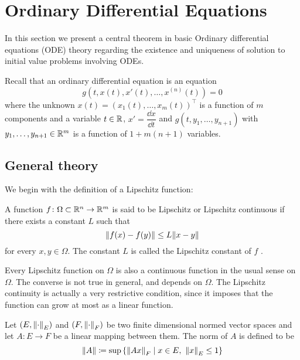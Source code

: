 
\section{Ordinary Differential Equations}

In this section we present a central theorem in basic Ordinary differential
equations (ODE) theory regarding the existence and uniqueness of solution to
initial value problems involving ODEs. 

Recall that an ordinary differential equation is an equation
\begin{equation}
	g(t, x(t), x'(t), \ldots, x^{(n)}(t)) = 0
\end{equation}
where the unknown $x(t) = (x_1(t), \ldots, x_m(t))^\top$ is a function of $m$
components and a variable $t \in \mathbb{R}$, $x' = \dfrac{\dd{x}}{\dd{t}}$ and $g(t,
y_1, \ldots, y_{n+1})$ with $y_1, \ldots, y_{n+1} \in \mathbb{R}^m$ is a function of
$1 + m(n+1)$ variables.

\subsection{General theory}

We begin with the definition of a Lipschitz function:

\begin{definition}
	A function $f \colon \Omega \subset \mathbb{R}^n \rightarrow \mathbb{R}^m$ is said to
	be Lipschitz or Lipschitz continuous if there exists a constant $L$ such
	that
	\begin{equation}
		\norm{f(x) - f(y)} \leq L \norm{x - y}
	\end{equation}
	for every $x, y \in \Omega$. The constant $L$ is called the
	Lipschitz constant of $f$ \cite{salsa2009pde}.
\end{definition}

Every Lipschitz function on $\Omega$ is also a continuous function in the usual
sense on $\Omega$. The converse is not true in general, and depends on $\Omega$.
The Lipschitz continuity is actually a very restrictive condition, since it
imposes that the function can grow at most as a linear function. 

\begin{definition}
	Let $(E, \norm{\cdot}_E)$ and $(F, \norm{\cdot}_F)$ be two finite
	dimensional normed vector spaces and let $A \colon E \rightarrow F$ be a
	linear mapping between them. The norm of $A$ is defined to be
	\begin{equation}
		\norm{A}
		\coloneqq
		\sup{\left\{ \norm{A x}_F \mid x \in E, \ \norm{x}_E \leq 1 \right\}}
	\end{equation}
\end{definition}

